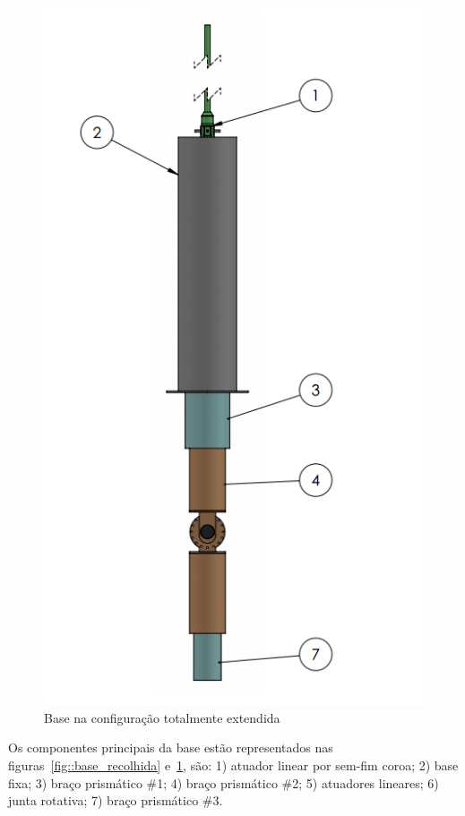 \begin{figure}[h!]
\centering
	\includegraphics[width=\columnwidth]{sota/figs/estudo/solid/Base_Extendida.PNG} 
	\caption{Base na configuração totalmente extendida}
	\label{fig::base_extendida}
\end{figure}

Os componentes principais da base estão representados nas
figuras~\ref{fig::base_recolhida} e~\ref{fig::base_extendida}, são: 1) atuador
linear por sem-fim coroa; 2) base fixa; 3) braço prismático \#1; 4) braço
prismático \#2; 5) atuadores lineares; 6) junta rotativa; 7) braço prismático
\#3.

